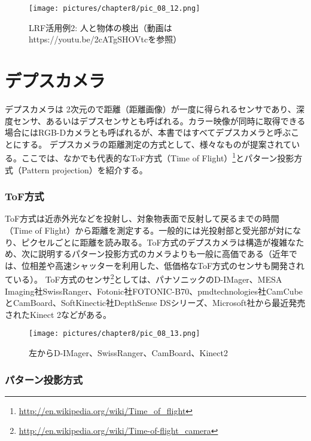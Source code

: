 \begin{figure}[htp]
  \centering
  \texttt{[image: pictures/chapter8/pic\_08\_12.png]}
  \caption{LRF活用例2: 人と物体の検出（動画はhttps://youtu.be/2cATgSHOVtcを参照）}
\end{figure}

\section{デプスカメラ}

デプスカメラは 2次元ので距離（距離画像）が一度に得られるセンサであり、深度センサ、あるいはデプスセンサとも呼ばれる。カラー映像が同時に取得できる場合にはRGB-Dカメラとも呼ばれるが、本書ではすべてデプスカメラと呼ぶことにする。
デプスカメラの距離測定の方式として、様々なものが提案されている。ここでは、なかでも代表的なToF方式（Time of Flight）\footnote{\url{http://en.wikipedia.org/wiki/Time\_of\_flight}}とパターン投影方式（Pattern projection）を紹介する。

\subsubsection{ToF方式}

ToF方式は近赤外光などを投射し、対象物表面で反射して戻るまでの時間（Time of Flight）から距離を測定する。一般的には光投射部と受光部が対になり、ピクセルごとに距離を読み取る。ToF方式のデプスカメラは構造が複雑なため、次に説明するパターン投影方式のカメラよりも一般に高価である（近年では、位相差や高速シャッターを利用した、低価格なToF方式のセンサも開発されている）。
ToF方式のセンサ\footnote{\url{http://en.wikipedia.org/wiki/Time-of-flight\_camera}}としては、パナソニックのD-IMager、MESA Imaging社SwissRanger、Fotonic社FOTONIC-B70、pmdtechnologies社CamCubeとCamBoard、SoftKinectic社DepthSense DSシリーズ、Microsoft社から最近発売されたKinect 2などがある。

\begin{figure}[htp]
  \centering
  \texttt{[image: pictures/chapter8/pic\_08\_13.png]}
  \caption{左からD-IMager、SwissRanger、CamBoard、Kinect2}
\end{figure}

\subsubsection{パターン投影方式}

